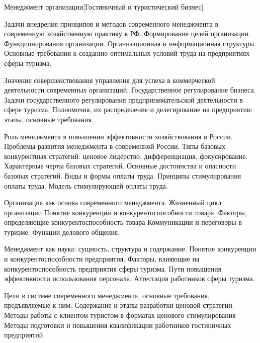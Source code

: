 \documentclass[
	11pt,
	a4paper,
	]
	{article}
\begin{document}
 {Менеджмент организации}[Гостиничный и туристический бизнес]

	

\noindent{} 
	{
		Задачи внедрения принципов и методов современного менеджмента в современную хозяйственную практику в РФ.
	}{
		Формирование целей организации. Функционирования организации. Организационная и информационная структуры.
	}{
		Основные требования к созданию оптимальных условий труда на предприятиях сферы туризма.
	}

\bigskip

\noindent{} 
	{
		Значение совершенствования управления для успеха в коммерческой деятельности современных организаций.
	}{
		Государственное регулирование бизнеса. Задачи государственного регулирования предпринимательской деятельности в сфере туризма.
	}{
		Полномочия, их распределение и делегирование на предприятии: этапы, основные требования.
	}

\bigskip

\noindent{} 
	{
		Роль менеджмента в повышении эффективности хозяйствования в России. Проблемы развития менеджмента в современной России.
	}{
		Типы базовых конкурентных стратегий: ценовое лидерство, дифференциация, фокусирование. Характерные черты базовых стратегий. Основные достоинства и опасности базовых стратегий.
	}{
		Виды и формы оплаты труда. Принципы стимулирования оплаты труда. Модель стимулирующей оплаты труда.
	}

\bigskip

\noindent{} 
	{
		Организация как основа современного менеджмента. Жизненный цикл организации
	}{
		Понятие конкуренции и конкурентоспособности товара. Факторы, определяющие конкурентоспособность товара
	}{
		Коммуникации и переговоры в туризме. Функции делового общения.
	}

\bigskip

\noindent{} 
	{
		Менеджмент как наука: сущность, структура и содержание.
	}{
		Понятие конкуренции и конкурентоспособности предприятия. Факторы, влияющие на конкурентоспособность предприятия сферы туризма.
	}{
		Пути повышения эффективности использования персонала. Аттестация работников сферы туризма.
	}

\bigskip

\noindent{} 
	{
		Цели в системе современного менеджмента, основные требования, предъявляемые к ним.
	}{
		Содержание и этапы разработки ценовой стратегии. Методы работы с клиентом-туристом в форматах ценового стимулирования
	}{
		Методы подготовки и повышения квалификации работников гостиничных предприятий.
	}
\end{document}
